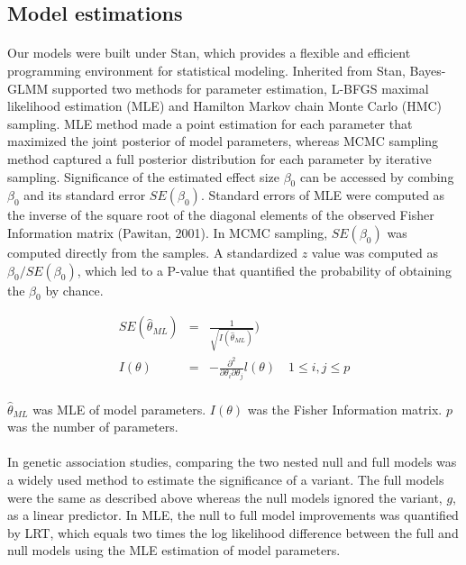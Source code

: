 \documentclass[12pt]{article}
\begin{document}
\subsection*{Model estimations}

\paragraph{}{
Our models were built under Stan, which provides a flexible and efficient programming environment for statistical modeling. Inherited from Stan, Bayes-GLMM supported two methods for parameter estimation, L-BFGS maximal likelihood estimation (MLE) and Hamilton Markov chain Monte Carlo (HMC) sampling. MLE method made a point estimation for each parameter that maximized the joint posterior of model parameters, whereas MCMC sampling method captured a full posterior distribution for each parameter by iterative sampling. Significance of the estimated effect size $\beta_0$ can be accessed by combing $\beta_0$ and its standard error $SE(\beta_0)$. Standard errors of MLE were computed as the inverse of the square root of the diagonal elements of the observed Fisher Information matrix (Pawitan, 2001). In MCMC sampling, $SE(\beta_0)$ was computed directly from the samples. A standardized $z$ value was computed as $\beta_0 / SE(\beta_0)$, which led to a P-value that quantified the probability of obtaining the $\beta_0$ by chance.
}


\begin{eqnarray}
SE(\hat{\theta}_{ML}) & = & \frac{1}{\sqrt{I(\hat{\theta}_{ML})}}) \\
I(\theta) & = & - \frac{\partial^2}{\partial \theta_i \partial \theta_j} l(\theta) \quad 1 \leq i,j \leq p
\end{eqnarray}

\paragraph{}{
$\hat{\theta}_{ML}$ was MLE of model parameters. $I(\theta)$ was the Fisher Information matrix. $p$ was the number of parameters.
}

\paragraph{}{
In genetic association studies, comparing the two nested null and full models was a widely used method to estimate the significance of a variant. The full models were the same as described above whereas the null models ignored the variant, $g$, as a linear predictor. In MLE, the null to full model improvements was quantified by LRT, which equals two times the log likelihood difference between the full and null models using the MLE estimation of model parameters.
}
\end{document}
